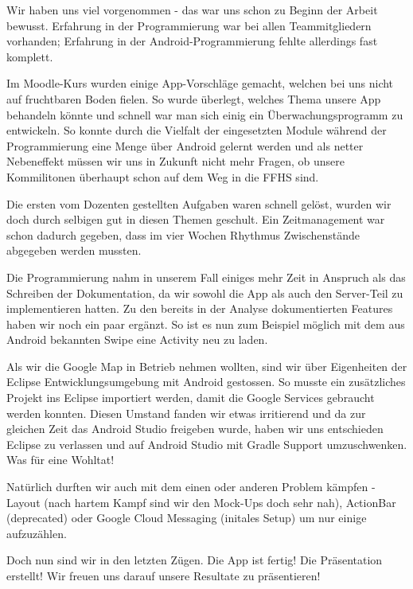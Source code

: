 Wir haben uns viel vorgenommen - das war uns schon zu Beginn der Arbeit bewusst. Erfahrung in der Programmierung war bei allen Teammitgliedern vorhanden; Erfahrung in der Android-Programmierung fehlte allerdings fast komplett.

Im Moodle-Kurs wurden einige App-Vorschläge gemacht, welchen bei uns nicht auf fruchtbaren Boden fielen. So wurde überlegt, welches Thema unsere App behandeln könnte und schnell war man sich einig ein Überwachungsprogramm zu entwickeln. So konnte durch die Vielfalt der eingesetzten Module während der Programmierung eine Menge über Android gelernt werden und als netter Nebeneffekt müssen wir uns in Zukunft nicht mehr Fragen, ob unsere Kommilitonen überhaupt schon auf dem Weg in die FFHS sind.

Die ersten vom Dozenten gestellten Aufgaben waren schnell gelöst, wurden wir doch durch selbigen gut in diesen Themen geschult. Ein Zeitmanagement war schon dadurch gegeben, dass im vier Wochen Rhythmus Zwischenstände abgegeben werden mussten. 

Die Programmierung nahm in unserem Fall einiges mehr Zeit in Anspruch als das Schreiben der Dokumentation, da wir sowohl die App als auch den Server-Teil zu implementieren hatten. Zu den bereits in der Analyse dokumentierten Features haben wir noch ein paar ergänzt. So ist es nun zum Beispiel möglich mit dem aus Android bekannten Swipe eine Activity neu zu laden. 

Als wir die Google Map in Betrieb nehmen wollten, sind wir über Eigenheiten der Eclipse Entwicklungsumgebung mit Android gestossen. So musste ein zusätzliches Projekt ins Eclipse importiert werden, damit die Google Services gebraucht werden konnten. Diesen Umstand fanden wir etwas irritierend und da zur gleichen Zeit das Android Studio freigeben wurde, haben wir uns entschieden Eclipse zu verlassen und auf Android Studio mit Gradle Support umzuschwenken. Was für eine Wohltat!

Natürlich durften wir auch mit dem einen oder anderen Problem kämpfen - Layout (nach hartem Kampf sind wir den Mock-Ups doch sehr nah), ActionBar (deprecated) oder Google Cloud Messaging (initales Setup) um nur einige aufzuzählen.

Doch nun sind wir in den letzten Zügen. Die App ist fertig! Die Präsentation erstellt! Wir freuen uns darauf unsere Resultate zu präsentieren!